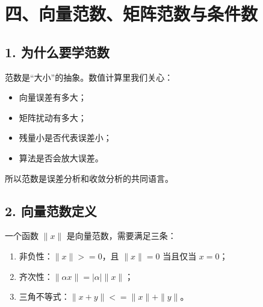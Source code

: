 \documentclass[11pt,a4paper]{ctexart}
\begin{document}

\section*{四、向量范数、矩阵范数与条件数}



\subsection*{1. 为什么要学范数}


范数是“大小”的抽象。数值计算里我们关心：

\begin{itemize}

\item 向量误差有多大；

\item 矩阵扰动有多大；

\item 残量小是否代表误差小；

\item 算法是否会放大误差。

\end{itemize}

所以范数是误差分析和收敛分析的共同语言。


\subsection*{2. 向量范数定义}


一个函数 $\|x\|$ 是向量范数，需要满足三条：

\begin{enumerate}

\item 非负性：$\|x\|>=0$，且 $\|x\|=0$ 当且仅当 $x=0$；

\item 齐次性：$\|\alpha x\|=|\alpha| \|x\|$；

\item 三角不等式：$\|x+y\|<=\|x\|+\|y\|$。

\end{enumerate}
\end{document}
